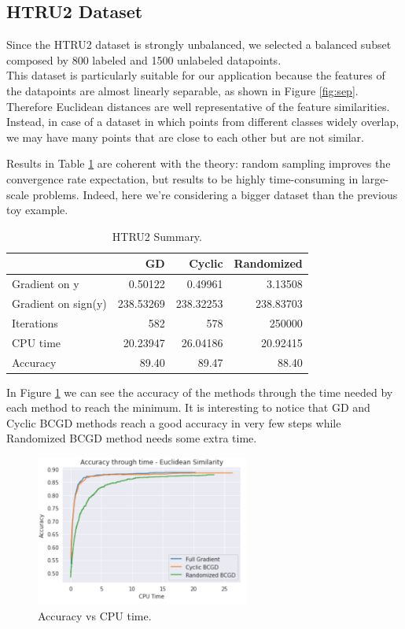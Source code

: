 \documentclass[10pt,twocolumn,letterpaper]{article}
\begin{document}
\subsection{HTRU2 Dataset}
Since the HTRU2 dataset is strongly unbalanced, we selected a balanced subset composed by 800 labeled and 1500 unlabeled datapoints.\\
This dataset is particularly suitable for our application because the features of the datapoints are almost linearly separable, as shown in Figure \ref{fig:sep}. Therefore Euclidean distances are well representative of the feature similarities. Instead, in case of a dataset in which points from different classes widely overlap, we may have many points that are close to each other but are not similar.

Results in Table \ref{tab:dataset} are coherent with the theory: random sampling improves the convergence rate expectation, but results to be highly time-consuming in large-scale problems. Indeed, here we're considering a bigger dataset than the previous toy example. \\ 
\begin{table}[h]
	\begin{center}
		\begin{tabular}{lrrr}
			{} &          GD &      Cyclic &     Randomized \\
			\midrule
			Gradient on y       &    0.50122 &    0.49961 &       3.13508 \\
			Gradient on sign(y) &  238.53269 &  238.32253 &     238.83703 \\
			Iterations          &  582 &  578 &  250000 \\
			CPU time            &   20.23947 &   26.04186 &      20.92415 \\
			Accuracy            &   89.40 &   89.47 &      88.40 \\
		\end{tabular}
	\end{center}
	\caption{HTRU2 Summary.}
	\label{tab:dataset}
\end{table}
\pagebreak

In Figure \ref{fig:accuracy} we can see the accuracy of the methods through the time needed by each method to reach the minimum. It is interesting to notice that GD and Cyclic BCGD methods reach a good accuracy in very few steps while Randomized BCGD method needs some extra time.

\renewcommand{\thefigure}{4}
\begin{figure}[htbp]
	\centering
	\includegraphics[width=7cm]{img/accuracy}
	\caption{Accuracy vs CPU time. }
	\label{fig:accuracy}
\end{figure}
\end{document}
